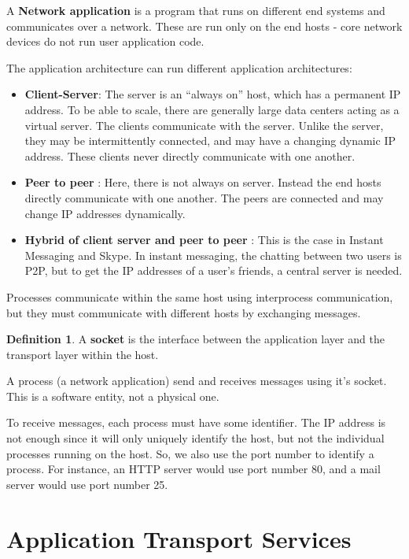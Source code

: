 \documentclass[12pt,letterpaper]{book}
\theoremstyle{definition}
\newtheorem{definition}{Definition}[section] %
\begin{document}
A \textbf{Network application} is a program that runs on different end systems and communicates over a network. These are run only on the end hosts - core network devices do not run user application code.

The application architecture can run different application architectures:

\begin{itemize}
  \item \textbf{Client-Server}: The server is an ``always on'' host, which has a permanent IP address. To be able to scale, there are generally large data centers acting as a virtual server. The clients communicate with the server. Unlike the server, they may be intermittently connected, and may have a changing dynamic IP address. These clients never directly communicate with one another.
  \item \textbf{Peer to peer} : Here, there is not always on server. Instead the end hosts directly communicate with one another. The peers are connected and may change IP addresses dynamically.
  \item \textbf{Hybrid of client server and peer to peer} : This is the case in Instant Messaging and Skype. In instant messaging, the chatting between two users is P2P, but to get the IP addresses of a user's friends, a central server is needed.
\end{itemize}

Processes communicate within the same host using interprocess communication, but they must communicate with different hosts by exchanging messages.

\begin{definition}
  A \textbf{socket} is the interface between the application layer and the transport layer within the host.
\end{definition}

A process (a network application) send and receives messages using it's socket. This is a software entity, not a physical one.

To receive messages, each process must have some identifier. The IP address is not enough since it will only uniquely identify the host, but not the individual processes running on the host. So, we also use the port number to identify a process. For instance, an HTTP server would use port number 80, and a mail server would use port number 25.

\section{Application Transport Services}
\end{document}
